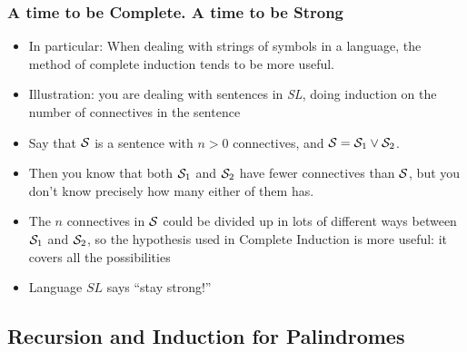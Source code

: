  \begin{frame}
\frametitle{A time to be Complete. A time to be Strong}

\begin{itemize}[<+->]
\item In particular: When dealing with strings of symbols in a language, the method of complete induction tends to be more useful. \\ 

\item Illustration: you are dealing with sentences in {\it{SL}}, doing induction on the number of connectives in the sentence %

\item Say that $\mathcal{S}$ is a sentence with $n > 0$ connectives, and $\mathcal{S} = \mathcal{S}_1 \vee \mathcal{S}_2$.

\item Then you know that both $\mathcal{S}_1$ and $\mathcal{S}_2$ have fewer connectives than $\mathcal{S}$, but you don't know precisely how many either of them has.

\item The $n$ connectives in $\mathcal{S}$ could be divided up in lots of different ways between $\mathcal{S}_1$ and $\mathcal{S}_2$, so the hypothesis used in Complete Induction is more useful: it covers all the possibilities 

\item Language $SL$ says ``stay strong!''

\end{itemize} 
\end{frame}



\subsection{Recursion and Induction for Palindromes}


